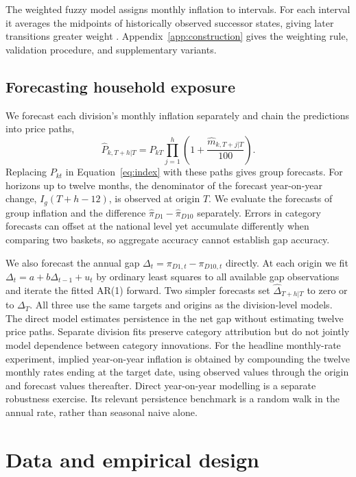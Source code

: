 \documentclass[11pt,a4paper]{article}
\begin{document}
The weighted fuzzy model assigns monthly inflation to intervals. For each interval it averages the midpoints of historically observed successor states, giving later transitions greater weight \citep{yu2005}. Appendix~\ref{app:construction} gives the weighting rule, validation procedure, and supplementary variants.

\subsection{Forecasting household exposure}

We forecast each division's monthly inflation separately and chain the predictions into price paths,
\begin{equation}
 \widehat P_{k,T+h|T}=P_{kT}
 \prod_{j=1}^{h}\left(1+\frac{\widehat m_{k,T+j|T}}{100}\right).
 \label{eq:chain}
\end{equation}
Replacing $P_{kt}$ in Equation~\eqref{eq:index} with these paths gives group forecasts. For horizons up to twelve months, the denominator of the forecast year-on-year change, $I_g(T+h-12)$, is observed at origin $T$. We evaluate the forecasts of group inflation and the difference $\widehat\pi_{D1}-\widehat\pi_{D10}$ separately. Errors in category forecasts can offset at the national level yet accumulate differently when comparing two baskets, so aggregate accuracy cannot establish gap accuracy.


We also forecast the annual gap $\Delta_t=\pi_{D1,t}-\pi_{D10,t}$ directly. At each origin we fit $\Delta_t=a+b\Delta_{t-1}+u_t$ by ordinary least squares to all available gap observations and iterate the fitted AR(1) forward. Two simpler forecasts set $\widehat\Delta_{T+h|T}$ to zero or to $\Delta_T$. All three use the same targets and origins as the division-level models. The direct model estimates persistence in the net gap without estimating twelve price paths. Separate division fits preserve category attribution but do not jointly model dependence between category innovations.
For the headline monthly-rate experiment, implied year-on-year inflation is obtained by compounding the twelve monthly rates ending at the target date, using observed values through the origin and forecast values thereafter. Direct year-on-year modelling is a separate robustness exercise. Its relevant persistence benchmark is a random walk in the annual rate, rather than seasonal naive alone.

\section{Data and empirical design}
\end{document}
